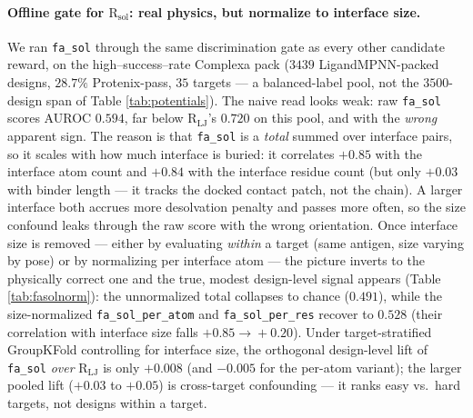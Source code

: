 \documentclass[11pt]{article}
\newcommand{\R}{\mathrm{R}}
\newcommand{\ttk}[1]{\texttt{\small #1}}
\begin{document}
\paragraph{Offline gate for $\R_{\mathrm{sol}}$: real physics, but normalize to interface size.} We
ran \ttk{fa\_sol} through the same discrimination gate as every other candidate reward, on the
high--success--rate Complexa pack ($3439$ LigandMPNN-packed designs, $28.7\%$ Protenix-pass, $35$
targets --- a balanced-label pool, not the $3500$-design span of Table
\ref{tab:potentials}). The naive read looks weak: raw \ttk{fa\_sol} scores AUROC $0.594$, far below
$\R_{\mathrm{LJ}}$'s $0.720$ on this pool, and with the \emph{wrong} apparent sign. The reason is
that \ttk{fa\_sol} is a \emph{total} summed over interface pairs, so it scales with how much
interface is buried: it correlates $+0.85$ with the interface atom count and $+0.84$ with the
interface residue count (but only $+0.03$ with binder length --- it tracks the docked contact patch,
not the chain). A larger interface both accrues more desolvation penalty and passes more often, so
the size confound leaks through the raw score with the wrong orientation. Once interface size is
removed --- either by evaluating \emph{within} a target (same antigen, size varying by pose) or by
normalizing per interface atom --- the picture inverts to the physically correct one and the true,
modest design-level signal appears (Table \ref{tab:fasolnorm}): the unnormalized total collapses to
chance ($0.491$), while the size-normalized \ttk{fa\_sol\_per\_atom} and \ttk{fa\_sol\_per\_res}
recover to $0.528$ (their correlation with interface size falls $+0.85\!\rightarrow\!+0.20$). Under
target-stratified GroupKFold controlling for interface size, the orthogonal design-level lift of
\ttk{fa\_sol} \emph{over} $\R_{\mathrm{LJ}}$ is only $+0.008$ (and $-0.005$ for the per-atom variant);
the larger pooled lift ($+0.03$ to $+0.05$) is cross-target confounding --- it ranks easy vs.\ hard
targets, not designs within a target.
\end{document}
